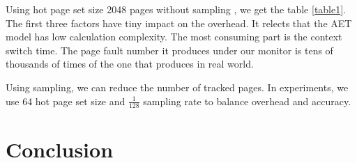 \documentclass[10pt,twocolumn]{article}
\begin{document}
Using hot page set size 2048 pages without sampling , we get the table \ref{table1}. The first three factors have tiny impact on the overhead. It relects that the AET model has low calculation complexity. The most consuming part is the context switch time. The page fault number it produces under our monitor is tens of thousands of times of the one that produces in real world.

Using sampling, we can reduce the number of tracked pages. In experiments, we use 64 hot page set size and $\frac{1}{128}$ sampling rate to balance overhead and accuracy.

\section{Conclusion}





\end{document}

